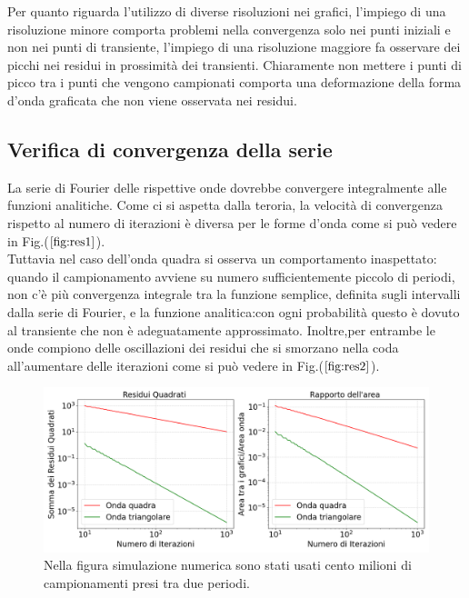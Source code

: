 \documentclass{article}
\begin{document}
        \noindent Per quanto riguarda l'utilizzo di diverse risoluzioni nei grafici, l'impiego di una risoluzione 
        minore comporta problemi nella convergenza solo nei punti iniziali e non nei punti di transiente,
        l'impiego di una risoluzione maggiore fa osservare dei picchi nei residui in prossimità dei transienti.
        Chiaramente non mettere i punti di picco tra i punti che vengono campionati 
        comporta una deformazione della forma d'onda graficata che non viene osservata 
        nei residui.




    \subsection{Verifica di convergenza della serie}
    \label{sez:residui}
       
        La serie di Fourier delle rispettive onde dovrebbe convergere integralmente alle funzioni analitiche.
        Come ci si aspetta dalla teroria, la velocità di convergenza rispetto al numero 
        di iterazioni è diversa per le forme d'onda come si può vedere 
        in Fig.($\ref{fig:res1}$).\\ 
        Tuttavia nel caso dell'onda quadra si osserva un comportamento inaspettato:
        quando il campionamento avviene su numero sufficientemente
        piccolo di periodi,  non c'è più convergenza integrale tra la funzione semplice, definita sugli 
        intervalli dalla serie di Fourier, e la funzione analitica:con ogni
        probabilità questo è dovuto al transiente che non è adeguatamente approssimato.
        Inoltre,per entrambe le onde compiono delle oscillazioni dei residui che si
        smorzano nella coda all'aumentare delle iterazioni come 
        si può vedere in Fig.($\ref{fig:res2}$).
        

        \begin{figure}[H]
            \centering
            \includegraphics[width=1\textwidth]{residuals1.png} %
            \caption{Nella figura simulazione numerica sono stati usati cento milioni di campionamenti presi tra due periodi.}
            \label{fig:res1}
        \end{figure}
\end{document}
